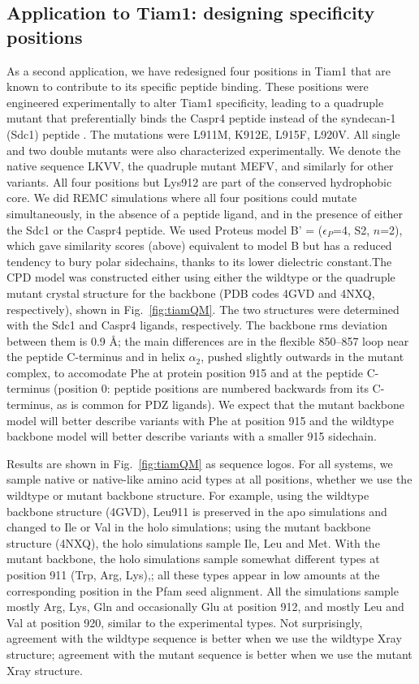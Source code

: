\documentclass[12pt]{article}
\begin{document}
\subsection{Application to Tiam1: designing specificity positions}
As a second application, we have redesigned four positions in Tiam1 that are known to contribute to its specific peptide binding.
These positions were engineered experimentally to alter Tiam1 specificity, leading to a quadruple mutant that preferentially binds
the Caspr4 peptide instead of the syndecan-1 (Sdc1) peptide \cite{Sheperd11}. The mutations were L911M, K912E, L915F, L920V. All
single and two double mutants were also characterized experimentally. We denote the native sequence LKVV, the quadruple mutant MEFV,
and similarly for other variants. All four positions but Lys912 are part of the conserved hydrophobic core. We did REMC simulations
where all four positions could mutate simultaneously, in the absence of a peptide ligand, and in the presence of either the Sdc1
or the Caspr4 peptide. We used Proteus model B' = ($\epsilon_P$=4, S2, $n$=2), which gave similarity scores (above) equivalent
to model B but has a reduced tendency to bury polar sidechains, thanks to its lower dielectric constant.The CPD model was
constructed either using either the wildtype or the quadruple mutant crystal structure for the backbone (PDB codes 4GVD and 4NXQ,
respectively), shown in Fig.\ \ref{fig:tiamQM}. The two structures were determined with the Sdc1 and Caspr4 ligands, respectively.
The backbone rms deviation between them is 0.9 \AA; the main differences are in the flexible 850--857 loop near the peptide C-terminus
and in helix $\alpha_2$, pushed slightly outwards in the mutant complex, to accomodate Phe at protein position 915 and at the
peptide C-terminus (position 0: peptide positions are numbered backwards from its C-terminus, as is common for PDZ ligands).
We expect that the mutant backbone model will better describe variants with Phe at position 915 and the wildtype backbone model
will better describe variants with a smaller 915 sidechain.

Results are shown in Fig.\ \ref{fig:tiamQM} as sequence logos. For all systems, we sample native or native-like amino acid types at
all positions, whether we use the wildtype or mutant backbone structure. For example, using the wildtype backbone structure (4GVD),
Leu911 is preserved in the apo simulations and changed to Ile or Val in the holo simulations; using the mutant backbone structure
(4NXQ), the holo simulations sample Ile, Leu and Met. With the mutant backbone, the holo simulations sample somewhat different types
at position 911 (Trp, Arg, Lys),; all these types appear in low amounts at the corresponding position in the Pfam seed alignment.
All the simulations sample mostly Arg, Lys, Gln and occasionally Glu at position 912, and mostly Leu and Val at position 920,
similar to the experimental types. Not surprisingly, agreement with the wildtype sequence is better when we use the wildtype Xray
structure; agreement with the mutant sequence is better when we use the mutant Xray structure.
\end{document}
